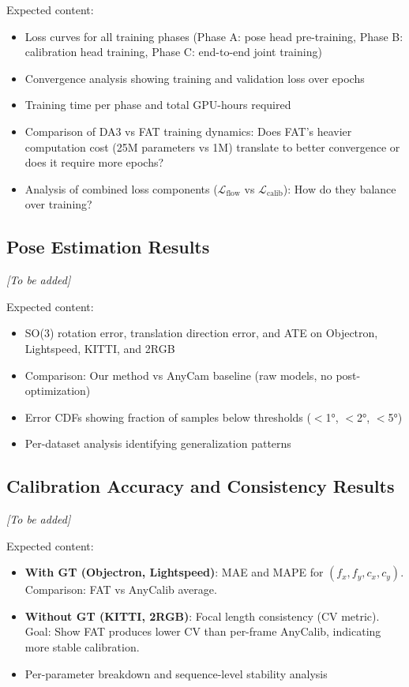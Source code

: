 Expected content:
\begin{itemize}
    \item Loss curves for all training phases (Phase A: pose head pre-training, Phase B: calibration head training, Phase C: end-to-end joint training)
    \item Convergence analysis showing training and validation loss over epochs
    \item Training time per phase and total GPU-hours required
    \item Comparison of DA3 vs FAT training dynamics: Does FAT's heavier computation cost (25M parameters vs 1M) translate to better convergence or does it require more epochs?
    \item Analysis of combined loss components ($\mathcal{L}_{\text{flow}}$ vs $\mathcal{L}_{\text{calib}}$): How do they balance over training?
\end{itemize}

\subsection{Pose Estimation Results}\label{sec:pose-results}

\emph{[To be added]}

Expected content:
\begin{itemize}
    \item SO(3) rotation error, translation direction error, and ATE on Objectron, Lightspeed, KITTI, and 2RGB
    \item Comparison: Our method vs AnyCam baseline (raw models, no post-optimization)
    \item Error CDFs showing fraction of samples below thresholds ($<$1°, $<$2°, $<$5°)
    \item Per-dataset analysis identifying generalization patterns
\end{itemize}

\subsection{Calibration Accuracy and Consistency Results}\label{sec:calib-results}

\emph{[To be added]}

Expected content:
\begin{itemize}
    \item \textbf{With GT (Objectron, Lightspeed)}: MAE and MAPE for $(f_x, f_y, c_x, c_y)$. Comparison: FAT vs AnyCalib average.
    \item \textbf{Without GT (KITTI, 2RGB)}: Focal length consistency (CV metric). Goal: Show FAT produces lower CV than per-frame AnyCalib, indicating more stable calibration.
    \item Per-parameter breakdown and sequence-level stability analysis
\end{itemize}

